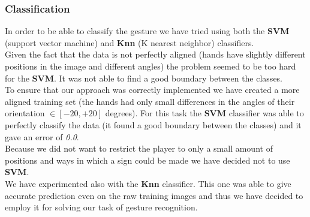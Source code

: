 \documentclass[a4paper, 11pt, twocolumn]{article}
\begin{document}
		\subsubsection{Classification}
		In order to be able to classify the gesture we have tried using both the \textbf{SVM} (support vector machine) and \textbf{Knn} (K nearest neighbor) classifiers.\\
		\hspace*{10px}Given the fact that the data is not perfectly aligned (hands have slightly different positions in the image and different angles) the problem seemed to be too hard for the \textbf{SVM}. It was not able to find a good boundary between the classes.\\
		\hspace*{10px}To ensure that our approach was correctly implemented we have created a more aligned training set (the hands had only small differences in the angles of their orientation $ \in [-20, +20]$ degrees). For this task the \textbf{SVM} classifier was able to perfectly classify the data (it found a good boundary between the classes) and it gave an error of \emph{0.0}.\\
		\hspace*{10px}Because we did not want to restrict the player to only a small amount of positions and ways in which a sign could be made we have decided not to use \textbf{SVM}.\\
		\hspace*{10px}We have experimented also with the \textbf{Knn} classifier. This one was able to give accurate prediction even on the raw training images and thus we have decided to employ it for solving our task of gesture recognition.
\end{document}
